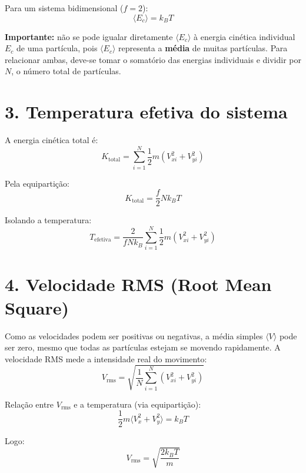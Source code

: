 \documentclass[12pt,a4paper]{article}
\begin{document}
Para um sistema bidimensional ($f = 2$):
\begin{equation}
    \langle E_c \rangle = k_B T
\end{equation}

\textbf{Importante:} não se pode igualar diretamente $\langle E_c \rangle$ à energia cinética individual $E_c$ de uma partícula, pois $\langle E_c \rangle$ representa a \textbf{média} de muitas partículas. 
Para relacionar ambas, deve-se tomar o somatório das energias individuais e dividir por $N$, o número total de partículas.

\section*{3. Temperatura efetiva do sistema}

A energia cinética total é:
\begin{equation}
    K_{\text{total}} = \sum_{i=1}^{N} \frac{1}{2} m (V_{xi}^2 + V_{yi}^2)
\end{equation}

Pela equipartição:
\begin{equation}
    K_{\text{total}} = \frac{f}{2} N k_B T
\end{equation}

Isolando a temperatura:
\begin{equation}
    \boxed{T_{\text{efetiva}} = \frac{2}{f N k_B} \sum_{i=1}^{N} \frac{1}{2} m (V_{xi}^2 + V_{yi}^2)}
\end{equation}

\section*{4. Velocidade RMS (Root Mean Square)}

Como as velocidades podem ser positivas ou negativas, a média simples $\langle V \rangle$ pode ser zero, mesmo que todas as partículas estejam se movendo rapidamente. 
A velocidade RMS mede a intensidade real do movimento:
\begin{equation}
    V_{\text{rms}} = \sqrt{\frac{1}{N} \sum_{i=1}^{N} (V_{xi}^2 + V_{yi}^2)}
\end{equation}

\noindent
Relação entre $V_{\text{rms}}$ e a temperatura (via equipartição):
\begin{equation}
    \frac{1}{2} m \langle V_x^2 + V_y^2 \rangle = k_B T
\end{equation}

Logo:
\begin{equation}
    \boxed{V_{\text{rms}} = \sqrt{\frac{2 k_B T}{m}}}
\end{equation}
\end{document}
